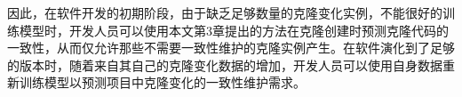 因此，在软件开发的初期阶段，由于缺乏足够数量的克隆变化实例，不能很好的训练模型时，开发人员可以使用本文第3章提出的方法在克隆创建时预测克隆代码的一致性，从而仅允许那些不需要一致性维护的克隆实例产生。在软件演化到了足够的版本时，随着来自其自己的克隆变化数据的增加，开发人员可以使用自身数据重新训练模型以预测项目中克隆变化的一致性维护需求。

